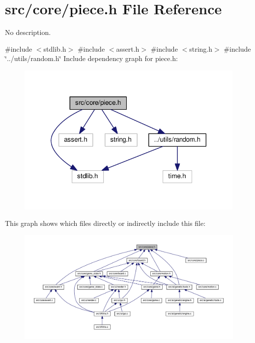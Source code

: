 \section{src/core/piece.h File Reference}
\label{piece_8h}


No description.  


{\ttfamily \#include $<$stdlib.\+h$>$}\newline
{\ttfamily \#include $<$assert.\+h$>$}\newline
{\ttfamily \#include $<$string.\+h$>$}\newline
{\ttfamily \#include \char`\"{}../utils/random.\+h\char`\"{}}\newline
Include dependency graph for piece.\+h\+:
\nopagebreak
\begin{figure}[H]
\begin{center}
\leavevmode
\includegraphics[width=317pt]{piece_8h__incl}
\end{center}
\end{figure}
This graph shows which files directly or indirectly include this file\+:
\nopagebreak
\begin{figure}[H]
\begin{center}
\leavevmode
\includegraphics[width=350pt]{piece_8h__dep__incl}
\end{center}
\end{figure}

